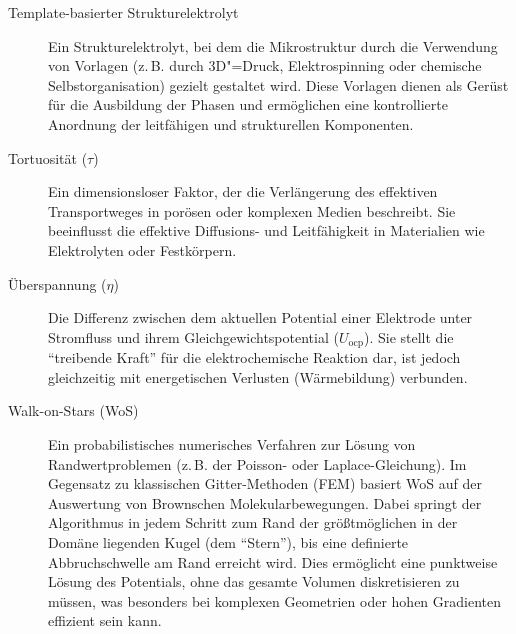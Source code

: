 \begin{description}
    \item[Template-basierter Strukturelektrolyt] Ein Strukturelektrolyt, bei dem die Mikrostruktur durch die Verwendung von Vorlagen (z.\,B. durch 3D"=Druck, Elektrospinning oder chemische Selbstorganisation) gezielt gestaltet wird. Diese Vorlagen dienen als Gerüst für die Ausbildung der Phasen und ermöglichen eine kontrollierte Anordnung der leitfähigen und strukturellen Komponenten.

    \item[Tortuosität ($\tau$)] Ein dimensionsloser Faktor, der die Verlängerung des effektiven Transportweges in porösen oder komplexen Medien beschreibt. Sie beeinflusst die effektive Diffusions- und Leitfähigkeit in Materialien wie Elektrolyten oder Festkörpern.

    \item[Überspannung ($\eta$)] Die Differenz zwischen dem aktuellen Potential einer Elektrode unter Stromfluss und ihrem Gleichgewichtspotential ($U_{\text{ocp}}$). Sie stellt die ``treibende Kraft'' für die elektrochemische Reaktion dar, ist jedoch gleichzeitig mit energetischen Verlusten (Wärmebildung) verbunden.

    \item[Walk-on-Stars (WoS)] Ein probabilistisches numerisches Verfahren zur Lösung von Randwertproblemen (z.\,B. der Poisson- oder Laplace-Gleichung). Im Gegensatz zu klassischen Gitter-Methoden (FEM) basiert WoS auf der Auswertung von Brownschen Molekularbewegungen. Dabei springt der Algorithmus in jedem Schritt zum Rand der größtmöglichen in der Domäne liegenden Kugel (dem ``Stern''), bis eine definierte Abbruchschwelle am Rand erreicht wird. Dies ermöglicht eine punktweise Lösung des Potentials, ohne das gesamte Volumen diskretisieren zu müssen, was besonders bei komplexen Geometrien oder hohen Gradienten effizient sein kann.
    
\end{description}

